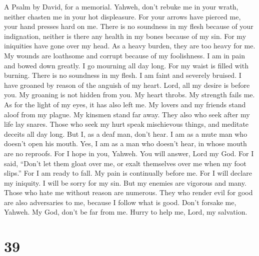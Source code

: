 A Psalm by David, for a memorial.  Yahweh, don't rebuke me
in your wrath, neither chasten me in your hot displeasure. 
For your arrows have pierced me, your hand presses hard on me.
 There is no soundness in my flesh because of your
indignation, neither is there any health in my bones because of my sin.
 For my iniquities have gone over my head. As a heavy
burden, they are too heavy for me.  My wounds are loathsome
and corrupt because of my foolishness.  I am in pain and
bowed down greatly. I go mourning all day long.  For my
waist is filled with burning. There is no soundness in my flesh.
 I am faint and severely bruised. I have groaned by reason
of the anguish of my heart.  Lord, all my desire is before
you. My groaning is not hidden from you.  My heart throbs.
My strength fails me. As for the light of my eyes, it has also left me.
 My lovers and my friends stand aloof from my plague. My
kinsmen stand far away.  They also who seek after my life
lay snares. Those who seek my hurt speak mischievous things, and
meditate deceits all day long.  But I, as a deaf man, don't
hear. I am as a mute man who doesn't open his mouth.  Yes,
I am as a man who doesn't hear, in whose mouth are no reproofs.
 For I hope in you, Yahweh. You will answer, Lord my God.
 For I said, ``Don't let them gloat over me, or exalt
themselves over me when my foot slips.''  For I am ready to
fall. My pain is continually before me.  For I will declare
my iniquity. I will be sorry for my sin.  But my enemies
are vigorous and many. Those who hate me without reason are numerous.
 They who render evil for good are also adversaries to me,
because I follow what is good.  Don't forsake me, Yahweh.
My God, don't be far from me.  Hurry to help me, Lord, my
salvation.

\hypertarget{section-38}{%
\section{39}\label{section-38}}

